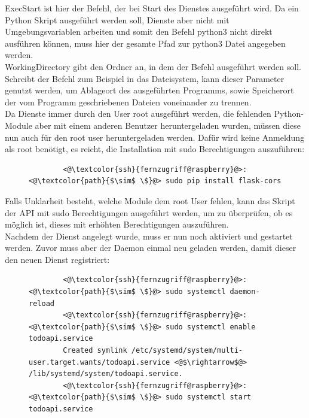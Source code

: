 \documentclass[a4paper, 11pt]{scrartcl}
\begin{document}
ExecStart ist hier der Befehl, der bei Start des Dienstes ausgeführt wird. Da ein Python Skript ausgeführt werden soll,
Dienste aber nicht mit Umgebungsvariablen arbeiten und somit den Befehl python3 nicht direkt ausführen können, muss hier
der gesamte Pfad zur python3 Datei angegeben werden.
\\
WorkingDirectory gibt den Ordner an, in dem der Befehl ausgeführt werden soll. Schreibt der Befehl zum Beispiel in das Dateisystem,
kann dieser Parameter genutzt werden, um Ablageort des ausgeführten Programms, sowie Speicherort der vom Programm geschriebenen
Dateien voneinander zu trennen.
\\
Da Dienste immer durch den User \glqq root\grqq{} ausgeführt werden, die fehlenden Python-Module aber mit einem anderen
Benutzer heruntergeladen wurden, müssen diese nun auch für den root user heruntergeladen werden. Dafür wird keine Anmeldung
als root benötigt, es reicht, die Installation mit sudo Berechtigungen auszuführen:
\begin{figure}[H]
    \begin{mdframed}[backgroundcolor=bbg]
        \begin{lstlisting}
        <@\textcolor{ssh}{fernzugriff@raspberry}@>:<@\textcolor{path}{$\sim$ \$}@> sudo pip install flask-cors
        \end{lstlisting}
    \end{mdframed}
    \label{lst:install_python_mods_sudo}
\end{figure}
Falls Unklarheit besteht, welche Module dem root User fehlen, kann das Skript der API mit sudo Berechtigungen ausgeführt werden, um zu überprüfen,
ob es möglich ist, dieses mit erhöhten Berechtigungen auszuführen.
\\
Nachdem der Dienst angelegt wurde, muss er nun noch aktiviert und gestartet werden. Zuvor muss aber der Daemon einmal neu geladen werden, damit dieser den neuen Dienst
registriert:
\begin{figure}[H]
    \begin{mdframed}[backgroundcolor=bbg]
        \begin{lstlisting}
        <@\textcolor{ssh}{fernzugriff@raspberry}@>:<@\textcolor{path}{$\sim$ \$}@> sudo systemctl daemon-reload
        <@\textcolor{ssh}{fernzugriff@raspberry}@>:<@\textcolor{path}{$\sim$ \$}@> sudo systemctl enable todoapi.service
        Created symlink /etc/systemd/system/multi-user.target.wants/todoapi.service <@$\rightarrow$@> /lib/systemd/system/todoapi.service.
        <@\textcolor{ssh}{fernzugriff@raspberry}@>:<@\textcolor{path}{$\sim$ \$}@> sudo systemctl start todoapi.service
        \end{lstlisting}
    \end{mdframed}
    \label{lst:enable_service}
\end{figure}
\end{document}
